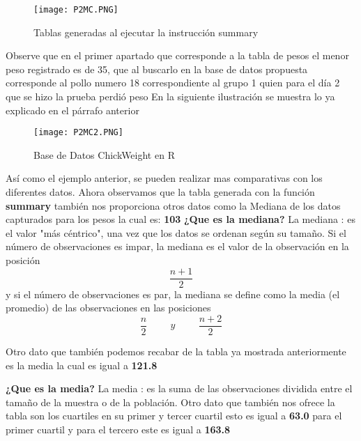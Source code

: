 \documentclass{article}
\begin{document}
\begin{figure}[h]
    \centering
    \texttt{[image: P2MC.PNG]}
    \caption{Tablas generadas al ejecutar la instrucción summary}
    \label{fig:mesh1}
\end{figure}

Observe que en el primer apartado que corresponde a la tabla de pesos el menor peso registrado es de 35, que al buscarlo en la base de datos propuesta corresponde al pollo numero 18 correspondiente al grupo 1 quien para el día 2 que se hizo la prueba perdió peso
En la siguiente ilustración se muestra lo ya explicado en el párrafo anterior
\newpage

\begin{figure}[h]
    \centering
    \texttt{[image: P2MC2.PNG]}
    \caption{Base de Datos ChickWeight en R }
    \label{fig:mesh2}
\end{figure}

Así como el ejemplo anterior, se pueden realizar mas comparativas con los diferentes datos.
\newline
Ahora observamos que la tabla generada con la función \textbf{summary} también nos proporciona otros datos como la Mediana de los datos capturados para los pesos la cual es: \textbf{103}
\newline
\newline
{}
\textbf{¿Que es la mediana?}
\newline
La mediana : es el valor "más céntrico", una vez que los datos se ordenan según su tamaño. Si el número de observaciones es impar, la mediana es el valor de la observación en la posición 
\begin{equation}
    \frac{n+1}{2}
\end{equation}
 y si el número de observaciones es par, la mediana se define como la media (el promedio) de las observaciones en las
posiciones
\begin{equation}
    \frac{n}{2} \hspace{1cm}  y  \hspace{1cm} \frac{n+2}{2}
\end{equation}

Otro dato que también podemos recabar de la tabla ya mostrada anteriormente es la media la cual es igual a \textbf{121.8}

\newpage
{}
\textbf{¿Que es la media?}
\newline
La media : es la suma de las observaciones dividida
entre el tamaño de la muestra o de la población.
\newline
\newline
Otro dato que también nos ofrece la tabla son los cuartiles en su primer y tercer cuartil esto es igual a \textbf{63.0} para el primer cuartil y para el tercero este es igual a \textbf{163.8}
\end{document}

